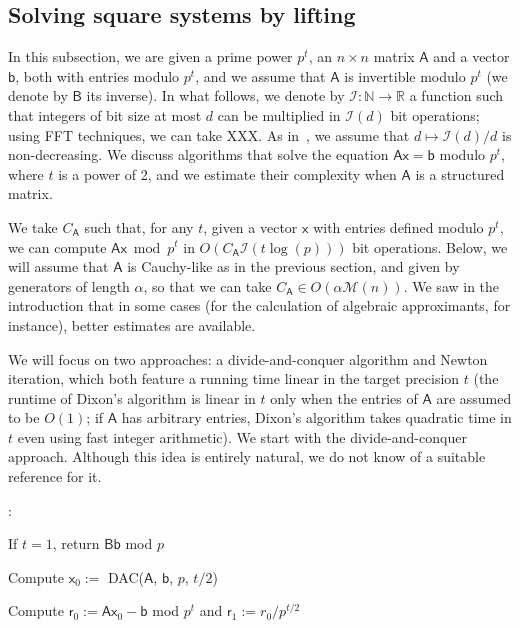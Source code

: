 \documentclass{sig-alternate}
\newcommand{\vb}{\ensuremath{\mathsf{b}}}
\newcommand{\vr}{\ensuremath{\mathsf{r}}}
\newcommand{\vx}{\ensuremath{\mathsf{x}}}
\newcommand{\mA}{\ensuremath{\mathsf{A}}}
\newcommand{\mB}{\ensuremath{\mathsf{B}}}
\newcommand{\M}{\ensuremath{\mathscr{M}}}
\begin{document}

\subsection{Solving square systems by lifting}

In this subsection, we are given a prime power $p^t$, an $n \times n$
matrix $\mA$ and a vector $\vb$, both with entries modulo $p^t$, and
we assume that $\mA$ is invertible modulo $p^t$ (we denote by $\mB$
its inverse). In what follows, we denote by $\mathscr{I}:\mathbb{N}
\to \mathbb{R}$ a function such that integers of bit size at most $d$
can be multiplied in $\mathscr{I}(d)$ bit operations; using FFT
techniques, we can take XXX. As in~\cite{GaGe13}, we assume that
$d\mapsto \mathscr{I}(d)/d$ is non-decreasing.  We discuss algorithms
that solve the equation $\mA \vx = \vb$ modulo $p^{t}$, where $t$ is a
power of 2, and we estimate their complexity when $\mA$ is a
structured matrix.

We take $C_\mA$ such that, for any $t$, given a vector $\vx$ with
entries defined modulo $p^t$, we can compute $\mA \vx \bmod p^t$ in
$O(C_\mA \mathscr{I}(t \log(p)))$ bit operations. Below, we will
assume that $\mA$ is Cauchy-like as in the previous section, and given
by generators of length $\alpha$, so that we can take $C_\mA \in
O(\alpha \M(n))$. We saw in the introduction that in some cases (for
the calculation of algebraic approximants, for instance), better
estimates are available.

We will focus on two approaches: a divide-and-conquer algorithm and
Newton iteration, which both feature a running time linear in the
target precision $t$ (the runtime of Dixon's algorithm is linear in
$t$ only when the entries of $\mA$ are assumed to be $O(1)$; if $\mA$
has arbitrary entries, Dixon's algorithm takes quadratic time in $t$
even using fast integer arithmetic). We start with the
divide-and-conquer approach. Although this idea is entirely natural,
we do not know of a suitable reference for it.

\smallskip\noindent{\textbf{DAC($\mA$, $b$, $p$, $t$)}}:

 If $t = 1$, return $\mB  \vb$ mod $p$

 Compute $\vx_0 := $ DAC($\mA$, $\vb$, $p$, $t/2$)

 Compute $\vr_0 := \mA  \vx_0 - \vb$ mod $p^t$ and $\vr_1 := r_0/ p^{t/2}$ 
\end{document}
